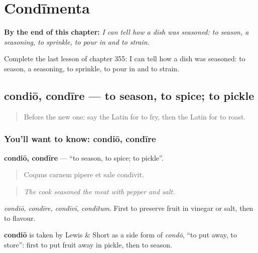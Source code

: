 
\chapter{Condīmenta}
\label{ch:la-condimenta}

\begin{chapteropening}
\textbf{By the end of this chapter:} \emph{I can tell how a dish was seasoned: to season, a seasoning, to sprinkle, to pour in and to strain.}

Complete the last lesson of chapter 355: I can tell how a dish was seasoned: to season, a seasoning, to sprinkle, to pour in and to strain.
\end{chapteropening}

\section[condiō, condīre]{condiō, condīre — to season, to spice; to pickle}

\label{lesson:LA-C355-condio}



\begin{quote}
Before the new one: say the Latin for to fry, then the Latin for to roast.
\end{quote}

\subsection*{You'll want to know: condiō, condīre}
\textbf{condiō, condīre} — \textquotedblleft{}to season, to spice; to pickle\textquotedblright{}.

\begin{quote}
Coquus carnem pipere et sale condīvit.
\end{quote}

\begin{quote}
\emph{The cook seasoned the meat with pepper and salt.}
\end{quote}

\emph{condiō, condīre, condīvī, condītum}. First to preserve fruit in vinegar or salt, then to flavour.

\begin{cousinweb}
\textbf{condiō} is taken by Lewis \& Short as a side form of \emph{condō}, \textquotedblleft{}to put away, to store\textquotedblright{}: first to put fruit away in pickle, then to season.
\end{cousinweb}

